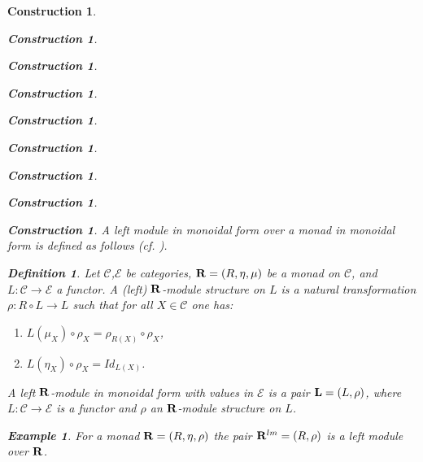 \documentclass[12pt]{amsart}
\newtheorem{definition}[proposition]{Definition}
\newtheorem{example}[proposition]{Example}
\newtheorem{construction}[proposition]{Construction}
\newcommand{\llabel}[1]{\label{#1}}
\newcommand{\sr}{\rightarrow}
\newcommand{\R}{{\bf R}}
\newcommand{\C}{{\mathcal C}}
\newcommand{\E}{{\mathcal E}}
\begin{document}
\begin{construction}
\begin{construction}
\begin{construction}
\begin{construction}
\begin{construction}
\begin{construction}
\begin{construction}
\begin{construction}
\begin{construction}
%
A left module in monoidal form over a monad in monoidal form is defined as follows (cf.{} \cite[p.~222]{HM2007}). 
%
\begin{definition}
\llabel{2017.04.01.def2} 
Let $\C$,$\E$ be categories, $\R=(R,\eta,\mu)$ be a
monad on $\C$, and $L:\C\sr \E$ a functor. A (left) $\R$-module structure on
$L$ is a natural transformation $\rho:R\circ L\sr L$ such that for all $X\in\C$
one has:
%
\begin{enumerate}
\item $L(\mu_X)\circ \rho_X=\rho_{R(X)}\circ \rho_X$,
\item $L(\eta_X)\circ \rho_X=Id_{L(X)}$.
\end{enumerate}
%
A left $\R$-module in monoidal form with values in $\E$ is a pair ${\bf
  L}=(L,\rho)$, where $L:\C\sr \E$ is a functor and $\rho$ an $\R$-module
structure on $L$.
\end{definition}
%
\begin{example}\llabel{2017.04.15.ex1}\rm
For a monad $\R=(R,\eta,\rho)$ the pair $\R^{lm}=(R,\rho)$ is a left module over $\R$.
\end{example}
%


\end{construction}
\end{construction}
\end{construction}
\end{construction}
\end{construction}
\end{construction}
\end{construction}
\end{construction}
\end{construction}
\end{document}
